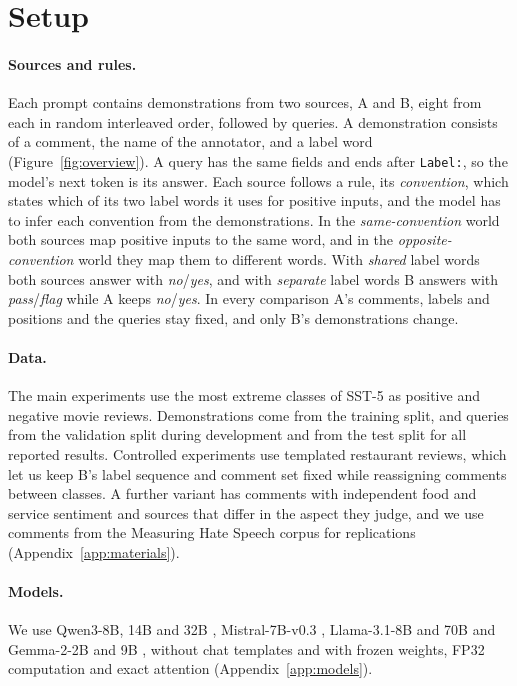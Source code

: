 \documentclass[11pt]{article}
\newcommand{\lw}[1]{\textit{#1}}
\begin{document}
\section{Setup}
\label{sec:setup}

\paragraph{Sources and rules.}
Each prompt contains demonstrations from two sources, A and B, eight from each in random interleaved order, followed by queries.
A demonstration consists of a comment, the name of the annotator, and a label word (Figure~\ref{fig:overview}). A query has the same fields and ends after \texttt{Label:}, so the model's next token is its answer.
Each source follows a rule, its \emph{convention}, which states which of its two label words it uses for positive inputs, and the model has to infer each convention from the demonstrations.
In the \emph{same-convention} world both sources map positive inputs to the same word, and in the \emph{opposite-convention} world they map them to different words.
With \emph{shared} label words both sources answer with \lw{no}/\lw{yes}, and with \emph{separate} label words B answers with \lw{pass}/\lw{flag} while A keeps \lw{no}/\lw{yes}.
In every comparison A's comments, labels and positions and the queries stay fixed, and only B's demonstrations change.

\paragraph{Data.}
The main experiments use the most extreme classes of SST-5 \citep{socher-etal-2013-recursive} as positive and negative movie reviews.
Demonstrations come from the training split, and queries from the validation split during development and from the test split for all reported results.
Controlled experiments use templated restaurant reviews, which let us keep B's label sequence and comment set fixed while reassigning comments between classes.
A further variant has comments with independent food and service sentiment and sources that differ in the aspect they judge, and we use comments from the Measuring Hate Speech corpus \citep{sachdeva-etal-2022-measuring} for replications (Appendix~\ref{app:materials}).

\paragraph{Models.}
We use Qwen3-8B, 14B and 32B \citep{yang2025qwen3}, Mistral-7B-v0.3 \citep{jiang2023mistral}, Llama-3.1-8B and 70B \citep{grattafiori2024llama} and Gemma-2-2B and 9B \citep{gemma2024gemma2}, without chat templates and with frozen weights, FP32 computation and exact attention (Appendix~\ref{app:models}).
\end{document}

